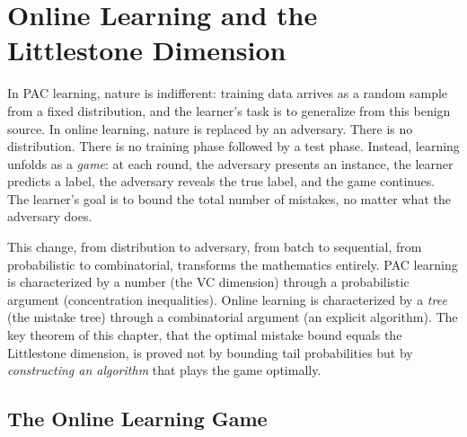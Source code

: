 

\chapter{Online Learning and the Littlestone Dimension}
\label{ch:online}

In PAC learning, nature is indifferent: training data arrives as a random sample from a fixed distribution, and the learner's task is to generalize from this benign source. In online learning, nature is replaced by an adversary. There is no distribution. There is no training phase followed by a test phase. Instead, learning unfolds as a \emph{game}: at each round, the adversary presents an instance, the learner predicts a label, the adversary reveals the true label, and the game continues. The learner's goal is to bound the total number of mistakes, no matter what the adversary does.

This change, from distribution to adversary, from batch to sequential, from probabilistic to combinatorial, transforms the mathematics entirely. PAC learning is characterized by a number (the VC dimension) through a probabilistic argument (concentration inequalities). Online learning is characterized by a \emph{tree} (the mistake tree) through a combinatorial argument (an explicit algorithm). The key theorem of this chapter, that the optimal mistake bound equals the Littlestone dimension, is proved not by bounding tail probabilities but by \emph{constructing an algorithm} that plays the game optimally.


\section{The Online Learning Game}
\label{sec:online-game}

